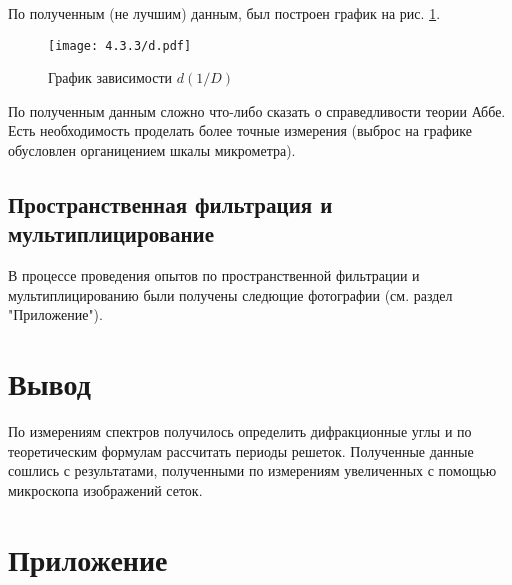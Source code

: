\documentclass[a4paper,12pt]{article} %
\begin{document}
По полученным (не лучшим) данным, был построен график на рис. \ref{gr}.

\begin{figure}[H]
    \centering
    \texttt{[image: 4.3.3/d.pdf]}
    \caption{График зависимости $d(1/D)$}
    \label{gr}
\end{figure}

По полученным данным сложно что-либо сказать о справедливости теории Аббе. Есть необходимость проделать более точные измерения (выброс на графике обусловлен органицением шкалы микрометра).

\subsection{Пространственная фильтрация и мультиплицирование}

В процессе проведения опытов по пространственной фильтрации и мультиплицированию были получены следющие фотографии (см. раздел "Приложение").






\section{Вывод}


По измерениям спектров получилось определить дифракционные углы и по теоретическим формулам рассчитать периоды решеток. Полученные данные сошлись с результатами,  полученными по измерениям увеличенных с помощью микроскопа изображений сеток.


\section{Приложение}
\end{document}
